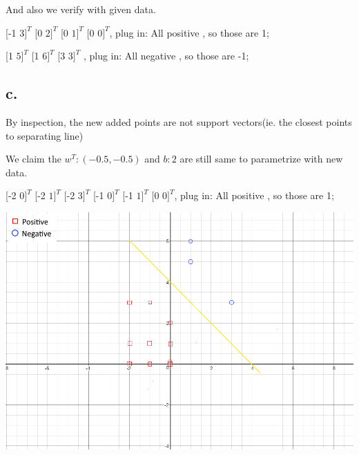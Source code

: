 \documentclass[12pt, letterpaper]{article}
\begin{document}
And also we verify with given data.

[-1 $3]^{T}$ [0 $2]^{T}$ [0 $1]^{T}$ [0 $0]^{T}$, plug in:
All positive , so those are 1;

[1 $5]^{T}$ [1 $6]^{T}$ [3 $3]^{T}$ , plug in:
All negative , so those are -1;



\subsection{c.}
By inspection, the new added points are not support vectors(ie. the closest points to separating line)

We claim the $w^{T}:(-0.5,-0.5)$ and $b:2$ are still same to parametrize with new data. 

[-2 $0]^{T}$ [-2 $1]^{T}$ [-2 $3]^{T}$ [-1 $0]^{T}$ [-1 $1]^{T}$ [0 $0]^{T}$, plug in:
All positive , so those are 1;

\includegraphics[scale=0.6]{"problem-3-c"}
\end{document}
